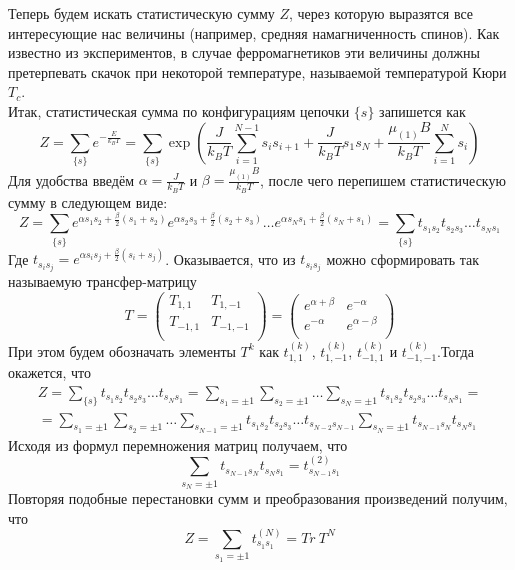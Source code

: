 \documentclass[oneside,final,14pt]{extarticle}
\begin{document}
	\noindent Теперь будем искать статистическую сумму $Z$, через которую выразятся все интересующие нас величины (например, средняя намагниченность спинов). Как известно из экспериментов, в случае ферромагнетиков эти величины должны претерпевать скачок при некоторой температуре, называемой температурой Кюри $T_{c}$. \\
	
	\noindent Итак, статистическая сумма по конфигурациям цепочки $\{s\}$ запишется как
	$$Z=\sum_{\{s\}}e^{-\frac{E}{k_{B}T}}=\sum_{\{s\}}\exp\left(\frac{J}{k_{B}T}\sum_{i=1}^{N-1}s_{i}s_{i+1}+\frac{J}{k_{B}T}s_{1}s_{N}+\frac{\mu_{(1)}B}{k_{B}T}\sum_{i=1}^{N}s_{i}\right)$$
	Для удобства введём $\alpha=\frac{J}{k_{B}T}$ и $\beta=\frac{\mu_{(1)}B}{k_{B}T}$, после чего перепишем статистическую сумму в следующем виде:
	$$Z=\sum_{\{s\}}e^{\alpha s_{1}s_{2}+\frac{\beta}{2}(s_{1}+s_{2})}e^{\alpha s_{2}s_{3}+\frac{\beta}{2}(s_{2}+s_{3})}\ldots e^{\alpha s_{N}s_{1}+\frac{\beta}{2}(s_{N}+s_{1})}=\sum_{\{s\}}t_{s_{1}s_{2}}t_{s_{2}s_{3}}\ldots t_{s_{N}s_{1}}$$
	Где $t_{s_{i}s_{j}}=e^{\alpha s_{i}s_{j}+\frac{\beta}{2}(s_{i}+s_{j})}$. Оказывается, что из $t_{s_{i}s_{j}}$ можно сформировать так называемую трансфер-матрицу 
	$$T=
	\begin{pmatrix}
		T_{1, 1} & T_{1, -1} \\
		T_{-1, 1} & T_{-1, -1} \\
	\end{pmatrix}=
	\begin{pmatrix}
		e^{\alpha+\beta} & e^{-\alpha} \\
		e^{-\alpha} & e^{\alpha-\beta} \\
	\end{pmatrix}$$
	При этом будем обозначать элементы $T^{k}$ как $t^{(k)}_{1, 1}$, $t^{(k)}_{1, -1}$, $t^{(k)}_{-1, 1}$ и $t^{(k)}_{-1, -1}$.Тогда окажется, что 
	\begin{multline*}
		Z=\sum_{\{s\}}t_{s_{1}s_{2}}t_{s_{2}s_{3}}\ldots t_{s_{N}s_{1}}=\sum_{s_{1}=\pm 1}\sum_{s_{2}=\pm 1}\ldots\sum_{s_{N}=\pm 1}t_{s_{1}s_{2}}t_{s_{2}s_{3}}\ldots t_{s_{N}s_{1}}= \\= \sum_{s_{1}=\pm 1}\sum_{s_{2}=\pm 1}\ldots\sum_{s_{N-1}=\pm 1}t_{s_{1}s_{2}}t_{s_{2}s_{3}}\ldots t_{s_{N-2}s_{N-1}}\sum_{s_{N}=\pm 1}t_{s_{N-1}s_{N}}t_{s_{N}s_{1}}
	\end{multline*}
	Исходя из формул перемножения матриц получаем, что 
	$$\sum_{s_{N}=\pm 1}t_{s_{N-1}s_{N}}t_{s_{N}s_{1}}=t^{(2)}_{s_{N-1}s_{1}}$$
	Повторяя подобные перестановки сумм и преобразования произведений получим, что 
	$$Z=\sum_{s_{1}=\pm 1}t^{(N)}_{s_{1}s_{1}}=Tr \ T^{N}$$
\end{document}

